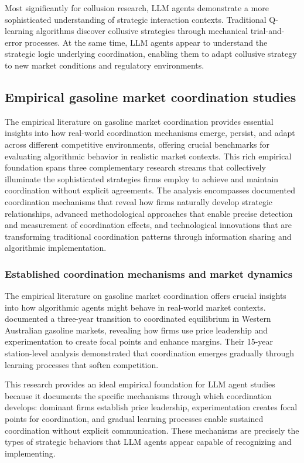 Most significantly for collusion research, LLM agents demonstrate a more sophisticated understanding of strategic interaction contexts. Traditional Q-learning algorithms discover collusive strategies through mechanical trial-and-error processes. At the same time, LLM agents appear to understand the strategic logic underlying coordination, enabling them to adapt collusive strategy to new market conditions and regulatory environments.

\subsection{Empirical gasoline market coordination studies}

The empirical literature on gasoline market coordination provides essential insights into how real-world coordination mechanisms emerge, persist, and adapt across different competitive environments, offering crucial benchmarks for evaluating algorithmic behavior in realistic market contexts. This rich empirical foundation spans three complementary research streams that collectively illuminate the sophisticated strategies firms employ to achieve and maintain coordination without explicit agreements. The analysis encompasses documented coordination mechanisms that reveal how firms naturally develop strategic relationships, advanced methodological approaches that enable precise detection and measurement of coordination effects, and technological innovations that are transforming traditional coordination patterns through information sharing and algorithmic implementation.

\subsubsection*{Established coordination mechanisms and market dynamics}

The empirical literature on gasoline market coordination offers crucial insights into how algorithmic agents might behave in real-world market contexts. \textcite{byrne_learning_2019} documented a three-year transition to coordinated equilibrium in Western Australian gasoline markets, revealing how firms use price leadership and experimentation to create focal points and enhance margins. Their 15-year station-level analysis demonstrated that coordination emerges gradually through learning processes that soften competition.

This research provides an ideal empirical foundation for LLM agent studies because it documents the specific mechanisms through which coordination develops: dominant firms establish price leadership, experimentation creates focal points for coordination, and gradual learning processes enable sustained coordination without explicit communication. These mechanisms are precisely the types of strategic behaviors that LLM agents appear capable of recognizing and implementing.

